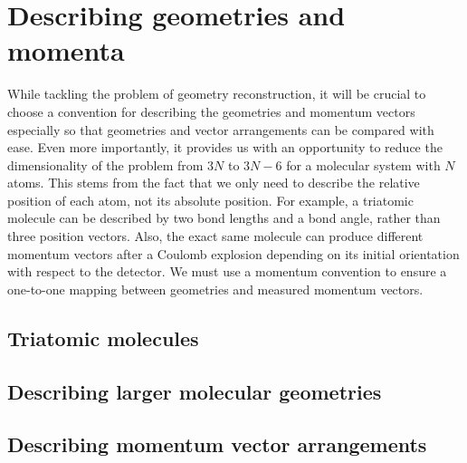 \section{Describing geometries and momenta} \label{sec:conventions}
While tackling the problem of geometry reconstruction, it will be crucial to choose a convention for describing the geometries and momentum vectors especially so that geometries and vector arrangements can be compared with ease. Even more importantly, it provides us with an opportunity to reduce the dimensionality of the problem from $3N$ to $3N-6$ for a molecular system with $N$ atoms. This stems from the fact that we only need to describe the relative position of each atom, not its absolute position. For example, a triatomic molecule can be described by two bond lengths and a bond angle, rather than three position vectors. Also, the exact same molecule can produce different momentum vectors after a Coulomb explosion depending on its initial orientation with respect to the detector. We must use a momentum convention to ensure a one-to-one mapping between geometries and measured momentum vectors.

\subsection{Triatomic molecules}
\subsection{Describing larger molecular geometries}
\subsection{Describing momentum vector arrangements}